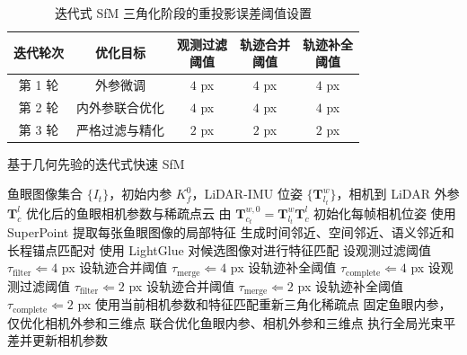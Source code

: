 {    \begin{table}[!htbp]
        \centering
        \caption{迭代式 SfM 三角化阶段的重投影误差阈值设置}
        \label{tab:app-sfm-triangulation-threshold}
        \scriptsize
        \setlength{\tabcolsep}{3pt}
        \begin{tabular}{ccccc}
            \toprule
            迭代轮次 & 优化目标 & \makecell[c]{观测过滤\\阈值} & \makecell[c]{轨迹合并\\阈值} & \makecell[c]{轨迹补全\\阈值} \\
            \midrule
            第 1 轮 & 外参微调 & \(4\) px & \(4\) px & \(4\) px \\
            第 2 轮 & 内外参联合优化 & \(4\) px & \(4\) px & \(4\) px \\
            第 3 轮 & 严格过滤与精化 & \(2\) px & \(2\) px & \(2\) px \\
            \bottomrule
        \end{tabular}
    \end{table}

    \begin{algorithm}[!htbp]
        \caption{基于几何先验的迭代式快速 SfM}
        \label{alg:app-fast-sfm}
        \begin{algorithmic}[1]
            \REQUIRE 鱼眼图像集合 \(\{I_t\}\)，初始内参 \(K_f^0\)，LiDAR-IMU 位姿 \(\{\mathbf{T}_{l_t}^{w}\}\)，相机到 LiDAR 外参 \(\mathbf{T}_{c}^{l}\)
            \ENSURE 优化后的鱼眼相机参数与稀疏点云
            \STATE 由 \(\mathbf{T}_{c_t}^{w,0}=\mathbf{T}_{l_t}^{w}\mathbf{T}_{c}^{l}\) 初始化每帧相机位姿
            \STATE 使用 SuperPoint 提取每张鱼眼图像的局部特征
            \STATE 生成时间邻近、空间邻近、语义邻近和长程锚点匹配对
            \STATE 使用 LightGlue 对候选图像对进行特征匹配
                    \STATE 设观测过滤阈值 \(\tau_{\mathrm{filter}}\Leftarrow 4\) px
                    \STATE 设轨迹合并阈值 \(\tau_{\mathrm{merge}}\Leftarrow 4\) px
                    \STATE 设轨迹补全阈值 \(\tau_{\mathrm{complete}}\Leftarrow 4\) px
                \ELSE
                    \STATE 设观测过滤阈值 \(\tau_{\mathrm{filter}}\Leftarrow 2\) px
                    \STATE 设轨迹合并阈值 \(\tau_{\mathrm{merge}}\Leftarrow 2\) px
                    \STATE 设轨迹补全阈值 \(\tau_{\mathrm{complete}}\Leftarrow 2\) px
                \ENDIF
                \STATE 使用当前相机参数和特征匹配重新三角化稀疏点
                    \STATE 固定鱼眼内参，仅优化相机外参和三维点
                \ELSE
                    \STATE 联合优化鱼眼内参、相机外参和三维点
                \ENDIF
                \STATE 执行全局光束平差并更新相机参数
            \ENDFOR
        \end{algorithmic}
    \end{algorithm}

}
